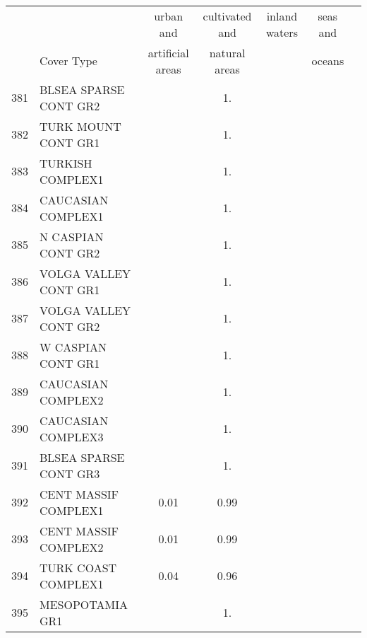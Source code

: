 {{ \clearpage
 \medskip\
 \begin{tabular}{||r|l||c|c|c|c|c||}
 \hline
 \hline
 && urban and & cultivated and &inland waters&seas and\\
 &Cover Type& artificial areas & natural areas&&oceans\\
 \hline
 \hline
         381  & BLSEA SPARSE CONT GR2                                        &       &  1.   &       &       \\
 \hline
         382  & TURK MOUNT CONT GR1                                          &       &  1.   &       &       \\
 \hline
         383  & TURKISH COMPLEX1                                             &       &  1.   &       &       \\
 \hline
         384  & CAUCASIAN COMPLEX1                                           &       &  1.   &       &       \\
 \hline
         385  & N CASPIAN CONT GR2                                           &       &  1.   &       &       \\
 \hline
         386  & VOLGA VALLEY CONT GR1                                        &       &  1.   &       &       \\
 \hline
         387  & VOLGA VALLEY CONT GR2                                        &       &  1.   &       &       \\
 \hline
         388  & W CASPIAN CONT GR1                                           &       &  1.   &       &       \\
 \hline
         389  & CAUCASIAN COMPLEX2                                           &       &  1.   &       &       \\
 \hline
         390  & CAUCASIAN COMPLEX3                                           &       &  1.   &       &       \\
 \hline
         391  & BLSEA SPARSE CONT GR3                                        &       &  1.   &       &       \\
 \hline
         392  & CENT MASSIF COMPLEX1                                         &  0.01 &  0.99 &       &       \\
 \hline
         393  & CENT MASSIF COMPLEX2                                         &  0.01 &  0.99 &       &       \\
 \hline
         394  & TURK COAST COMPLEX1                                          &  0.04 &  0.96 &       &       \\
 \hline
         395  & MESOPOTAMIA GR1                                              &       &  1.   &       &       \\

\end{tabular}}}
